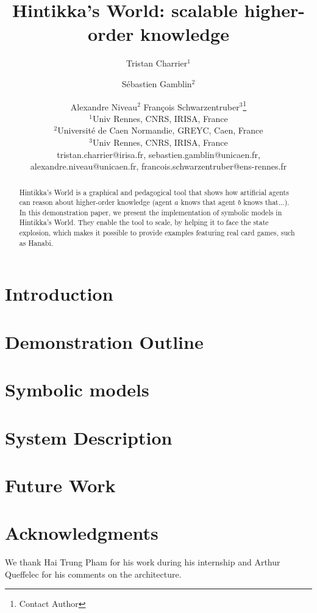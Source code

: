 \documentclass{article}
\title{Hintikka's World: scalable higher-order knowledge}
\author{
Tristan Charrier$^1$\and
Sébastien Gamblin$^2$\and
Alexandre Niveau$^{2}$\And
François Schwarzentruber$^3$\footnote{Contact Author}\\
\affiliations
$^1$Univ Rennes, CNRS, IRISA, France\\
$^2$Université de Caen Normandie, GREYC, Caen, France\\
$^3$Univ Rennes, CNRS, IRISA, France\\
\emails
tristan.charrier@irisa.fr, 
sebastien.gamblin@unicaen.fr,
alexandre.niveau@unicaen.fr,
francois.schwarzentruber@ens-rennes.fr
}
\begin{document}
\newcommand{\mettel}{\textsf{MetTeL2}\xspace}
\newcommand{\citet}[1]{\citeauthor{#1}~\shortcite{#1}}

\maketitle

\begin{abstract}
	Hintikka's World is a graphical and pedagogical tool that shows how artificial agents can reason about higher-order knowledge (agent $a$ knows that agent $b$ knows that...).
	In this demonstration paper, we present the implementation of symbolic models in Hintikka's World. They enable the tool to scale, by helping it to face the state explosion, which makes it possible to provide examples featuring real card games, such as Hanabi.
\end{abstract}



\section{Introduction}


\section{Demonstration Outline}
\label{section:demonstration}



\section{Symbolic models}
\label{section:symbolicmodels}








\section{System Description}
\label{section:architecture}


\section{Future Work}
\label{section:perspectives}


\section{Acknowledgments}

We thank Hai Trung Pham for his work during his internship and Arthur Queffelec for his comments on the architecture.








\newpage





\end{document}
